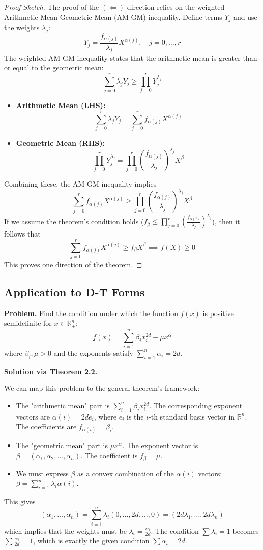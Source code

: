 \documentclass{article}
\begin{document}
\begin{proof}[Proof Sketch]
The proof of the $(\Leftarrow)$ direction relies on the weighted Arithmetic Mean-Geometric Mean (AM-GM) inequality.
Define terms $Y_j$ and use the weights $\lambda_j$:
\[
   Y_j = \frac{f_{\alpha(j)}}{\lambda_j} X^{\alpha(j)}, \quad j = 0, \dots, r
\]
The weighted AM-GM inequality states that the arithmetic mean is greater than or equal to the geometric mean:
\[
   \sum_{j=0}^r \lambda_j Y_j \geq \prod_{j=0}^r Y_j^{\lambda_j}
\]
\begin{itemize}
   \item \textbf{Arithmetic Mean (LHS):}
   \[
      \sum_{j=0}^r \lambda_j Y_j = \sum_{j=0}^r f_{\alpha(j)} X^{\alpha(j)}
   \]
   \item \textbf{Geometric Mean (RHS):}
   \[
      \prod_{j=0}^r Y_j^{\lambda_j} = \prod_{j=0}^r \left( \frac{f_{\alpha(j)}}{\lambda_j} \right)^{\lambda_j} X^{\beta}
   \]
\end{itemize}
Combining these, the AM-GM inequality implies
\[
   \sum_{j=0}^r f_{\alpha(j)} X^{\alpha(j)} \geq \prod_{j=0}^r \left( \frac{f_{\alpha(j)}}{\lambda_j} \right)^{\lambda_j} X^{\beta}
\]
If we assume the theorem's condition holds ($f_{\beta} \leq \prod_{j=0}^r (\frac{f_{\alpha(j)}}{\lambda_j})^{\lambda_j}$),
then it follows that
\[
   \sum_{j=0}^r f_{\alpha(j)} X^{\alpha(j)} \geq f_{\beta} X^{\beta} \implies f(X) \geq 0
\]
This proves one direction of the theorem.
\end{proof}


\subsection*{Application to D-T Forms}
	\textbf{Problem.} Find the condition under which the function $f(x)$ is positive semidefinite for $x \in \mathbb{R}_+^n$:
\[
   f(x) = \sum_{i=1}^n \beta_i x_i^{2d} - \mu x^{\alpha}
\]
where $\beta_i, \mu > 0$ and the exponents satisfy $\sum_{i=1}^n \alpha_i = 2d$.

	\textbf{Solution via Theorem 2.2.}

We can map this problem to the general theorem's framework:
\begin{itemize}
   \item The "arithmetic mean" part is $\sum_{i=1}^n \beta_i x_i^{2d}$. The corresponding exponent vectors are $\alpha(i) = 2d e_i$, where $e_i$ is the $i$-th standard basis vector in $\mathbb{R}^n$. The coefficients are $f_{\alpha(i)} = \beta_i$.
   \item The "geometric mean" part is $\mu x^{\alpha}$. The exponent vector is $\beta = (\alpha_1, \alpha_2, \dots, \alpha_n)$.
   The coefficient is $f_{\beta} = \mu$.
   \item We must express $\beta$ as a convex combination of the $\alpha(i)$ vectors: $\beta = \sum_{i=1}^n \lambda_i \alpha(i)$.
\end{itemize}
This gives
\[
   (\alpha_1, \dots, \alpha_n) = \sum_{i=1}^n \lambda_i (0, \dots, 2d, \dots, 0) = (2d \lambda_1, \dots, 2d \lambda_n)
\]
which implies that the weights must be $\lambda_i = \frac{\alpha_i}{2d}$.
The condition $\sum \lambda_i = 1$ becomes $\sum \frac{\alpha_i}{2d} = 1$, which is exactly the given condition
$\sum \alpha_i = 2d$.
\end{document}
